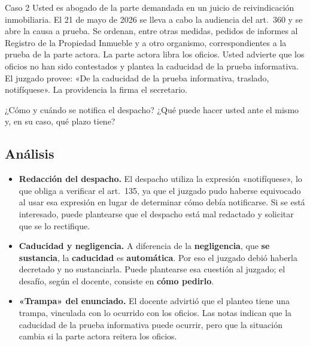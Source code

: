 \documentclass[12pt,oneside]{book}
\begin{document}
\begin{exercise}{Caso 2}
Usted es abogado de la parte demandada en un juicio de reivindicación inmobiliaria. El 21 de mayo de 2026 se lleva a cabo la audiencia del art.~360 y se abre la causa a prueba. Se ordenan, entre otras medidas, pedidos de informes al Registro de la Propiedad Inmueble y a otro organismo, correspondientes a la prueba de la parte actora. La parte actora libra los oficios. Usted advierte que los oficios no han sido contestados y plantea la caducidad de la prueba informativa. El juzgado provee: «De la caducidad de la prueba informativa, traslado, notifíquese». La providencia la firma el secretario.

¿Cómo y cuándo se notifica el despacho? ¿Qué puede hacer usted ante el mismo y, en su caso, qué plazo tiene?
\end{exercise}

\subsection{Análisis}

\begin{itemize}
    \item \textbf{Redacción del despacho.} El despacho utiliza la expresión «notifíquese», lo que obliga a verificar el art.~135, ya que el juzgado pudo haberse equivocado al usar esa expresión en lugar de determinar cómo debía notificarse. Si se está interesado, puede plantearse que el despacho está mal redactado y solicitar que se lo rectifique.
    \item \textbf{Caducidad y negligencia.} A diferencia de la \textbf{negligencia}, que \textbf{se sustancia}, la \textbf{caducidad} es \textbf{automática}. Por eso el juzgado debió haberla decretado y no sustanciarla. Puede plantearse esa cuestión al juzgado; el desafío, según el docente, consiste en \textbf{cómo pedirlo}.
    \item \textbf{«Trampa» del enunciado.} El docente advirtió que el planteo tiene una trampa, vinculada con lo ocurrido con los oficios. Las notas indican que la caducidad de la prueba informativa puede ocurrir, pero que la situación cambia si la parte actora reitera los oficios.
\end{itemize}
\end{document}
